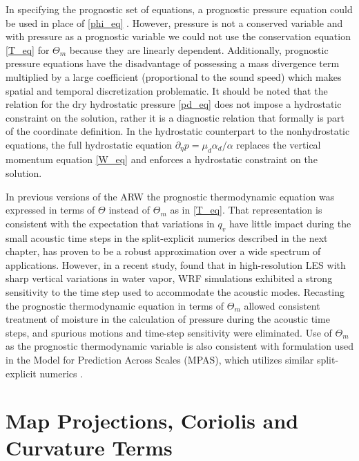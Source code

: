 In specifying the prognostic set of equations, a prognostic pressure equation could be used in
place of \eqref{phi_eq} \citep[see][]{laprise92}. However, pressure is
not a conserved variable and with pressure as a prognostic variable we could not use the conservation equation \eqref{T_eq} for $\Theta_m$  because
they are linearly dependent.  
Additionally, prognostic pressure
equations have the disadvantage of possessing a mass divergence term
multiplied by a large coefficient (proportional to the sound speed)
which makes spatial and temporal discretization problematic.
It should be noted that the relation for the dry hydrostatic pressure
\eqref{pd_eq} does not impose a hydrostatic constraint on
the solution, rather it is a diagnostic relation that formally is part
of the coordinate definition.  In the hydrostatic counterpart to the
nonhydrostatic equations, the full hydrostatic equation $\partial_\eta p=\mu_d\alpha_d/\alpha$ replaces the
vertical momentum equation \eqref{W_eq} and enforces a hydrostatic 
constraint on the solution.

In previous versions of the ARW the prognostic thermodynamic equation was expressed in terms of $\Theta$ instead of $\Theta_m$ as in \eqref{T_eq}. That representation is consistent with the expectation that variations in $q_v$ have little impact during the small acoustic time steps in the split-explicit numerics described in the next chapter, has proven to be a robust approximation over a wide spectrum of applications. However, in a recent study, \citet{xiao15} found that in high-resolution LES with sharp vertical variations in water vapor, WRF simulations exhibited a strong sensitivity to the time step used to accommodate the acoustic modes. Recasting the prognostic thermodynamic equation in terms of $\Theta_m$ allowed consistent treatment of moisture in the calculation of pressure during the acoustic time steps, and spurious motions and time-step sensitivity were eliminated. Use of $\Theta_m$ as the prognostic thermodynamic variable is also consistent with formulation used in the Model for Prediction Across Scales (MPAS), which utilizes similar split-explicit numerics \citep{skamarock12}.


\section{Map Projections, Coriolis and Curvature Terms}
\label{spherical_projections}

